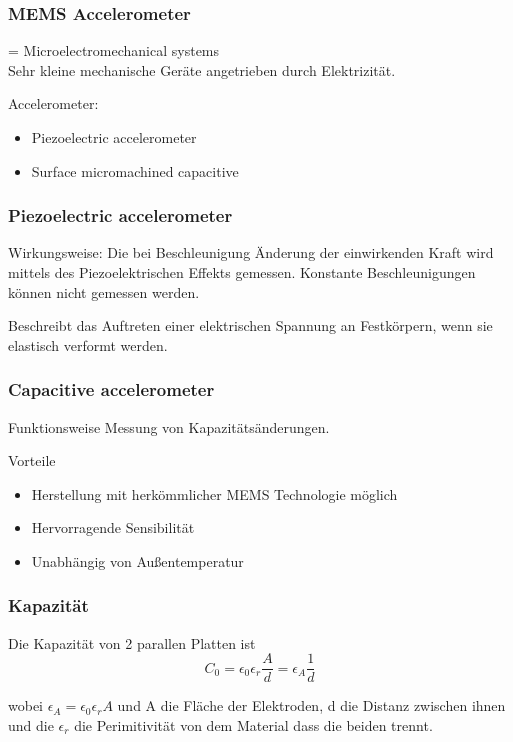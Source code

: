 \documentclass[10pt,a4paper,oneside]{beamer}
\begin{document}
\begin{frame}
  \frametitle{MEMS Accelerometer}
  
  \begin{definition}[MEMS]
  = Microelectromechanical systems \\
  Sehr kleine mechanische Geräte angetrieben durch Elektrizität.
  \end{definition}
  \medskip 
  Accelerometer:
  \begin{itemize}
    \item Piezoelectric accelerometer
  	\item Surface micromachined capacitive
  \end{itemize}
\end{frame}

\begin{frame}
  \frametitle{Piezoelectric accelerometer}
  Wirkungsweise: Die bei Beschleunigung Änderung der einwirkenden Kraft wird mittels des Piezoelektrischen Effekts gemessen.
  Konstante Beschleunigungen können nicht gemessen werden.
    \bigskip
    \begin{definition}[Piezoelektrizität]
		Beschreibt das Auftreten einer elektrischen Spannung an Festkörpern, wenn sie elastisch verformt werden.
	\end{definition}
\end{frame}

\begin{frame}
	\frametitle{Capacitive accelerometer}
	\begin{block}{Funktionsweise}
		Messung von Kapazitätsänderungen.
	\end{block}

    \bigskip
   
	Vorteile
 	\begin{itemize}
 		\item Herstellung mit herkömmlicher MEMS Technologie möglich
 		\item Hervorragende Sensibilität
		\item Unabhängig von Außentemperatur
 	\end{itemize}
\end{frame}

\begin{frame}
	\frametitle{Kapazität}
	Die Kapazität von 2 parallen Platten ist \cite{AM08}
	\begin{equation}
		C_{0} = \epsilon_{0} \epsilon_{r} \frac{A}{d} = \epsilon_{A} \frac{1}{d}
	\end{equation}
	
	wobei $\epsilon_{A} = \epsilon_{0} \epsilon_{r} A$ und A die Fläche der Elektroden, d die Distanz zwischen ihnen und die $\epsilon_{r}$ die Perimitivität von dem Material dass die beiden trennt.

\end{frame}
\end{document}

